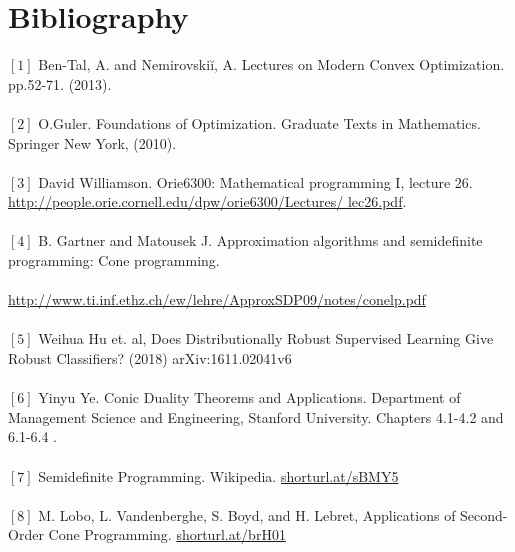 \documentclass[12pt]{article}
\begin{document}
   \section{Bibliography}
$[1]$ Ben-Tal, A. and Nemirovskiĭ, A. Lectures on Modern Convex Optimization. pp.52-71. (2013). \\ \\
$[2]$ O.Guler. Foundations of Optimization. Graduate Texts in Mathematics. Springer New York, (2010). \\ \\
$[3]$ David Williamson. Orie6300: Mathematical programming I, lecture 26. \href{http://people.orie.cornell.edu/dpw/orie6300/Lectures/
lec26.pdf}{http://people.orie.cornell.edu/dpw/orie6300/Lectures/
lec26.pdf}. \\ \\
$[4]$ B. Gartner and Matousek J. Approximation algorithms and semidefinite programming: Cone programming. \\ \\ \href{http://www.ti.inf.ethz.ch/ew/lehre/ApproxSDP09/notes/conelp.pdf}{http://www.ti.inf.ethz.ch/ew/lehre/ApproxSDP09/notes/conelp.pdf} \\ \\
$[5]$ Weihua Hu et. al, Does Distributionally Robust Supervised Learning Give Robust Classifiers? (2018) arXiv:1611.02041v6 \\ \\
$[6]$ Yinyu Ye. Conic Duality Theorems and Applications. Department of Management Science and Engineering, Stanford University. Chapters 4.1-4.2 and 6.1-6.4 . \\ \\
$[7]$ Semidefinite Programming. Wikipedia. \href{https://en.wikipedia.org/wiki/Semidefinite_programming?fbclid=IwAR3yDiE4Lw8C3v5PeXjoMaWtUMwu4RgdJrY9JSBXeqWpI-BlYDanlfBIDzc}{shorturl.at/sBMY5} \\ \\ 
$[8]$ M. Lobo, L. Vandenberghe, S. Boyd, and H. Lebret, Applications of Second-Order Cone Programming. \href{https://web.stanford.edu/~boyd/papers/socp.html?fbclid=IwAR1qAub1KZIVUQYaEdqDMKR6Y2V-8gZf3rPB2RbpHejNpKf05Cod3dWBDPw}{shorturl.at/brH01}

	
\end{document}
